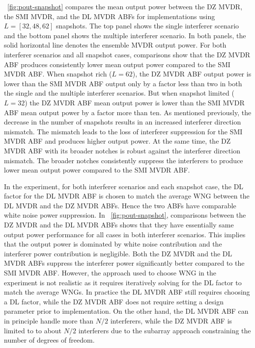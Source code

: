 \figurename{}~\ref{fig:pout-snapshot} compares the mean output power
between the DZ MVDR, the SMI MVDR, and the DL MVDR ABFs for
implementations using $L = [32, 48, 62]$ snapshots. The top panel
shows the single interferer scenario and the bottom panel shows the
multiple interferer scenario. In both panels, the solid horizontal
line denotes the ensemble MVDR output power. For both interferer
scenarios and all snapshot cases, comparisons show that the DZ MVDR ABF
produces consistently lower mean output power compared to the SMI MVDR
ABF. When snapshot rich ($L = 62$), the DZ MVDR ABF output power is
lower than the SMI MVDR ABF output only by a factor less than two in
both the single and the multiple interferer scenarios. But when
snapshot limited ($L = 32$) the DZ MVDR ABF mean output power is lower
than the SMI MVDR ABF mean output power by a factor more than ten. As
mentioned previously, the decrease in the number of snapshots results
in an increased interferer direction mismatch. The mismatch leads to the
loss of interferer suppression for the SMI MVDR ABF and produces
higher output power. At the same time, the DZ MVDR ABF with its
broader notches is robust against the interferer direction
mismatch. The broader notches consistently suppress the interferers to
produce lower mean output power compared to the SMI MVDR ABF.

In the experiment, for both interferer scenarios and each snapshot
case, the DL factor for the DL MVDR ABF is chosen to match the average
WNG between the DL MVDR and the DZ MVDR ABFs. Hence the two ABFs have
comparable white noise power suppression. In
\figurename{}~\ref{fig:pout-snapshot}, comparisons between the DZ MVDR
and the DL MVDR ABFs shows that they have essentially same output
power performance for all cases in both interferer scenarios. This
implies that the output power is dominated by white noise contribution
and the interferer power contribution is negligible. Both the DZ MVDR
and the DL MVDR ABFs suppress the interferer power significantly
better compared to the SMI MVDR ABF. However, the approach used to
choose WNG in the experiment is not realistic as it requires
iteratively solving for the DL factor to match the average WNGs. In
practice the DL MVDR ABF still requires choosing a DL factor, while
the DZ MVDR ABF does not require setting a design parameter prior to
implementation. On the other hand, the DL MVDR ABF can in principle
handle more than $N/2$ interferers, while the DZ MVDR ABF is limited
to to about $N/2$ interferers due to the subarray approach
constraining the number of degrees of freedom.

